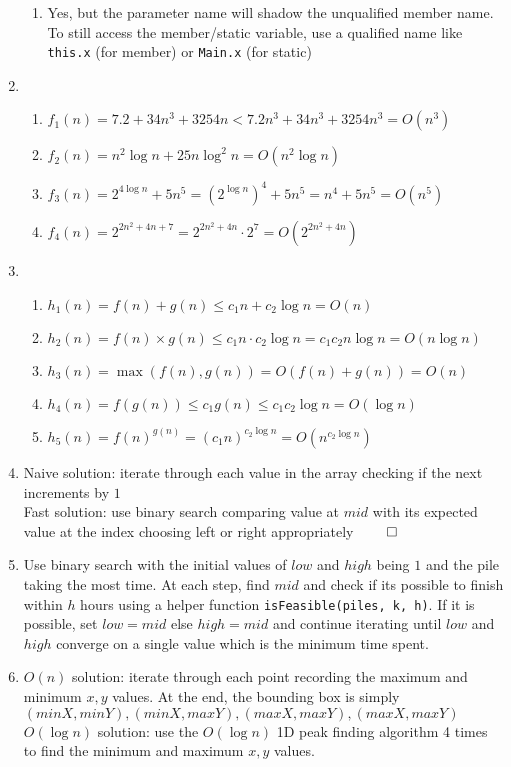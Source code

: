 \documentclass[12pt, a4paper]{article}
\begin{document}
\begin{enumerate}[Q\arabic*.]
\begin{enumerate}[(\alph*.)]
      \item Yes, but the parameter name will shadow the unqualified member name. To still access the member/static variable, use a qualified name like \lstinline|this.x| (for member) or \lstinline|Main.x| (for static)
    \end{enumerate}

  \pagebreak
  \item 
    \begin{enumerate}[(\alph*.)]
      \item $f_1(n) = 7.2 + 34n^3 + 3254n < 7.2n^3 + 34n^3 + 3254n^3 = O(n^3)$
      \item $f_2(n) = n^2\log n + 25n\log^2 n= O(n^2 \log n)$
      \item $f_3(n) = 2^{4\log n} + 5n^5 = (2^{\log n})^4 + 5n^5 = n^4 + 5n^5 = O(n^5)$
      \item $f_4(n) = 2^{2n^2+4n+7} = 2^{2n^2+4n}\cdot 2^7 = O(2^{2n^2+4n})$
    \end{enumerate}

  \item 
    \begin{enumerate}[(\alph*.)]
      \item $h_1(n) = f(n) + g(n) \leq c_1n + c_2\log n = O(n)$
      \item $h_2(n) = f(n) \times g(n) \leq c_1n \cdot c_2 \log n = c_1c_2n\log n = O(n\log n)$
      \item $h_3(n) = \max(f(n), g(n)) = O(f(n) + g(n)) = O(n)$
      \item $h_4(n) = f(g(n)) \leq c_1g(n) \leq c_1c_2\log n = O(\log n)$
      \item $h_5(n) = f(n)^{g(n)} = (c_1n)^{c_2\log n} = O(n^{c_2\log n})$
    \end{enumerate}

  \item Naive solution: iterate through each value in the array checking if the next increments by $1$\\
    Fast solution: use binary search comparing value at $mid$ with its expected value at the index choosing left or right appropriately $\qed$

  \item Use binary search with the initial values of $low$ and $high$ being $1$ and the pile taking the most time. At each step, find $mid$ and check if its possible to finish within $h$ hours using a helper function \lstinline|isFeasible(piles, k, h)|. If it is possible, set $low = mid$ else $high = mid$ and continue iterating until $low$ and $high$ converge on a single value which is the minimum time spent.

  \item $O(n)$ solution: iterate through each point recording the maximum and minimum $x,y$ values. At the end, the bounding box is simply $(minX, minY), (minX, maxY), (maxX, maxY), (maxX, maxY)$\\
    $O(\log n)$ solution: use the $O(\log n)$ 1D peak finding algorithm 4 times to find the minimum and maximum $x,y$ values.
\end{enumerate}
\end{document}
